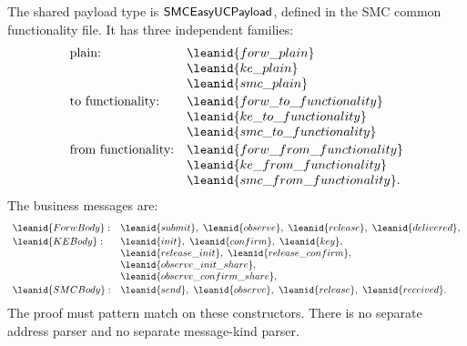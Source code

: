 \begin{definition}
The shared payload type is \(\mathsf{SMCEasyUCPayload}\), defined in the SMC common
functionality file.  It has three independent families:
\[
\begin{array}{ll}
\hbox{plain:}&
  \leanid{forw\_plain}\\
& \leanid{ke\_plain}\\
& \leanid{smc\_plain}\\[0.2em]
\hbox{to functionality:}&
  \leanid{forw\_to\_functionality}\\
& \leanid{ke\_to\_functionality}\\
& \leanid{smc\_to\_functionality}\\[0.2em]
\hbox{from functionality:}&
  \leanid{forw\_from\_functionality}\\
& \leanid{ke\_from\_functionality}\\
& \leanid{smc\_from\_functionality}.
\end{array}
\]
The business messages are:
\[
\begin{array}{ll}
\leanid{ForwBody}:&
  \leanid{submit},\ \leanid{observe},\ \leanid{release},\
  \leanid{delivered},\\[0.2em]
\leanid{KEBody}:&
  \leanid{init},\ \leanid{confirm},\ \leanid{key},\\
& \leanid{release\_init},\ \leanid{release\_confirm},\\
& \leanid{observe\_init\_share},\\
& \leanid{observe\_confirm\_share},\\[0.2em]
\leanid{SMCBody}:&
  \leanid{send},\ \leanid{observe},\ \leanid{release},\
  \leanid{received}.
\end{array}
\]
The proof must pattern match on these constructors.  There is no separate
address parser and no separate message-kind parser.
\end{definition}

